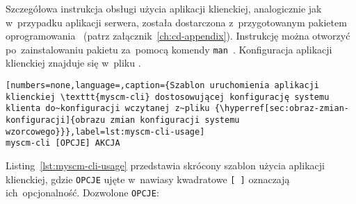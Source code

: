 \documentclass[thesis]{subfiles}
\begin{document}
Szczegółowa instrukcja obsługi użycia aplikacji klienckiej, analogicznie jak w~przypadku aplikacji serwera, została dostarczona z~przygotowanym pakietem oprogramowania \texttt{\cliappname{}}~(patrz załącznik~\ref{ch:cd-appendix}). Instrukcję można otworzyć po~zainstalowaniu pakietu \texttt{\cliappname{}} za~pomocą komendy \texttt{man~\cliappname{}}. Konfiguracja aplikacji klienckiej znajduje się w~pliku \myscmcliconfig{}.

\begin{lstlisting}[numbers=none,language=,caption={Szablon uruchomienia aplikacji klienckiej \texttt{myscm-cli} dostosowującej konfigurację systemu klienta do~konfiguracji wczytanej z~pliku {\hyperref[sec:obraz-zmian-konfiguracji]{obrazu zmian konfiguracji systemu wzorcowego}}},label=lst:myscm-cli-usage]
myscm-cli [OPCJE] AKCJA
\end{lstlisting}

Listing~\ref{lst:myscm-cli-usage} przedstawia skrócony szablon użycia aplikacji klienckiej, gdzie \texttt{OPCJE} ujęte w~nawiasy kwadratowe \texttt{[~]} oznaczają ich~opcjonalność. Dozwolone \texttt{OPCJE}:\mynobreakpar
\end{document}
